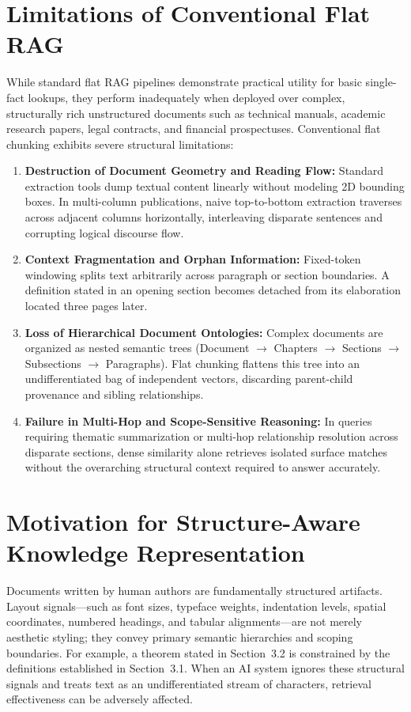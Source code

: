 \documentclass[12pt,a4paper]{report}
\begin{document}
\section{Limitations of Conventional Flat RAG}
While standard flat RAG pipelines demonstrate practical utility for basic single-fact lookups, they perform inadequately when deployed over complex, structurally rich unstructured documents such as technical manuals, academic research papers, legal contracts, and financial prospectuses. Conventional flat chunking exhibits severe structural limitations:
\begin{enumerate}
    \item \textbf{Destruction of Document Geometry and Reading Flow:} Standard extraction tools dump textual content linearly without modeling 2D bounding boxes. In multi-column publications, naive top-to-bottom extraction traverses across adjacent columns horizontally, interleaving disparate sentences and corrupting logical discourse flow.
    \item \textbf{Context Fragmentation and Orphan Information:} Fixed-token windowing splits text arbitrarily across paragraph or section boundaries. A definition stated in an opening section becomes detached from its elaboration located three pages later.
    \item \textbf{Loss of Hierarchical Document Ontologies:} Complex documents are organized as nested semantic trees (Document $\rightarrow$ Chapters $\rightarrow$ Sections $\rightarrow$ Subsections $\rightarrow$ Paragraphs). Flat chunking flattens this tree into an undifferentiated bag of independent vectors, discarding parent-child provenance and sibling relationships.
    \item \textbf{Failure in Multi-Hop and Scope-Sensitive Reasoning:} In queries requiring thematic summarization or multi-hop relationship resolution across disparate sections, dense similarity alone retrieves isolated surface matches without the overarching structural context required to answer accurately.
\end{enumerate}

\section{Motivation for Structure-Aware Knowledge Representation}
Documents written by human authors are fundamentally structured artifacts. Layout signals---such as font sizes, typeface weights, indentation levels, spatial coordinates, numbered headings, and tabular alignments---are not merely aesthetic styling; they convey primary semantic hierarchies and scoping boundaries. For example, a theorem stated in Section~3.2 is constrained by the definitions established in Section~3.1. When an AI system ignores these structural signals and treats text as an undifferentiated stream of characters, retrieval effectiveness can be adversely affected. 
\end{document}
